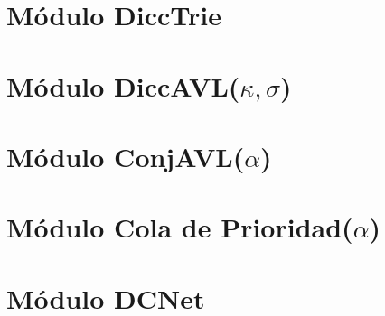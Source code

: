 \documentclass[a4paper,10pt, nofootinbib]{article}
\begin{document}
\section{Módulo DiccTrie}

\clearpage

\section{Módulo DiccAVL($\kappa, \sigma$)}

\clearpage

\section{Módulo ConjAVL($\alpha$)}

\clearpage


\section{Módulo Cola de Prioridad($\alpha$)}

\clearpage

\section{Módulo DCNet}


\clearpage
\end{document}
